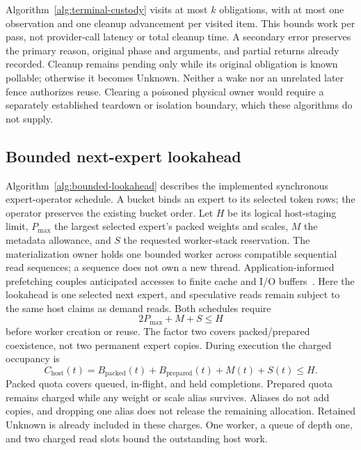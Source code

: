 Algorithm~\ref{alg:terminal-custody} visits at most $k$ obligations, with at
most one observation and one cleanup advancement per visited item. This
bounds work per pass, not provider-call latency or total cleanup time.
A secondary error preserves the primary reason, original phase and arguments,
and partial returns already recorded. Cleanup remains pending only while its
original obligation is known pollable; otherwise it becomes Unknown.
Neither a wake nor an unrelated later fence authorizes reuse. Clearing a
poisoned physical owner would require a separately established teardown or
isolation boundary, which these algorithms do not supply.

\subsection{Bounded next-expert lookahead}
\label{sec:bounded-lookahead}
Algorithm~\ref{alg:bounded-lookahead} describes the implemented synchronous
expert-operator schedule. A bucket binds an expert to its selected token
rows; the operator preserves the existing bucket order. Let $H$ be its logical
host-staging limit, $P_{\max}$ the largest selected expert's packed weights
and scales, $M$ the
metadata allowance, and $S$ the requested worker-stack reservation. The
materialization owner holds one bounded worker across compatible sequential
read sequences; a sequence does not own a new thread.
Application-informed prefetching couples anticipated accesses to finite cache
and I/O buffers~\cite{patterson1995informed}. Here the lookahead is one
selected next expert, and speculative reads remain subject to the same host
claims as demand reads. Both schedules require
\begin{equation}
 2P_{\max}+M+S\leq H
 \label{eq:host-read-bound}
\end{equation}
before worker creation or reuse. The factor two covers packed/prepared
coexistence, not two permanent expert copies. During execution the charged
occupancy is
\begin{equation}
 C_{\mathrm{host}}(t)=B_{\mathrm{packed}}(t)+B_{\mathrm{prepared}}(t)
                    +M(t)+S(t)\leq H.
 \label{eq:host-logical-charge}
\end{equation}
Packed quota covers queued, in-flight, and held completions. Prepared quota
remains charged while any weight or scale alias survives. Aliases do not add
copies, and dropping one alias does not release the remaining allocation.
Retained Unknown is already included in these charges. One worker, a queue
of depth one, and two charged read slots bound the outstanding host work.

